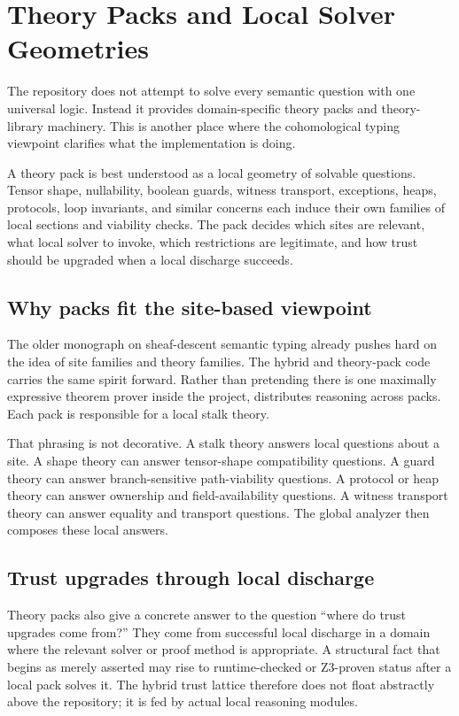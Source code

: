 \chapter{Theory Packs and Local Solver Geometries}

The repository does not attempt to solve every semantic question with one universal logic.
Instead it provides domain-specific theory packs and theory-library machinery. This is
another place where the cohomological typing viewpoint clarifies what the implementation is
doing.

A theory pack is best understood as a local geometry of solvable questions. Tensor shape,
nullability, boolean guards, witness transport, exceptions, heaps, protocols, loop
invariants, and similar concerns each induce their own families of local sections and
viability checks. The pack decides which sites are relevant, what local solver to invoke,
which restrictions are legitimate, and how trust should be upgraded when a local discharge
succeeds.

\section*{Why packs fit the site-based viewpoint}
The older monograph on sheaf-descent semantic typing already pushes hard on the idea of
site families and theory families. The hybrid and theory-pack code carries the same spirit
forward. Rather than pretending there is one maximally expressive theorem prover inside the
project, \DepPy{} distributes reasoning across packs. Each pack is responsible for a local
stalk theory.

That phrasing is not decorative. A stalk theory answers local questions about a site. A
shape theory can answer tensor-shape compatibility questions. A guard theory can answer
branch-sensitive path-viability questions. A protocol or heap theory can answer ownership
and field-availability questions. A witness transport theory can answer equality and
transport questions. The global analyzer then composes these local answers.

\section*{Trust upgrades through local discharge}
Theory packs also give a concrete answer to the question ``where do trust upgrades come
from?'' They come from successful local discharge in a domain where the relevant solver or
proof method is appropriate. A structural fact that begins as merely asserted may rise to
runtime-checked or Z3-proven status after a local pack solves it. The hybrid trust lattice
therefore does not float abstractly above the repository; it is fed by actual local
reasoning modules.

